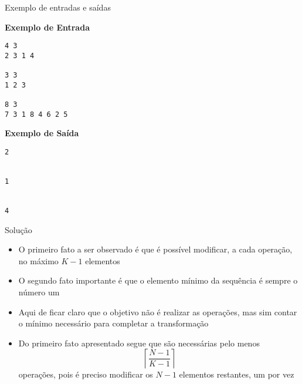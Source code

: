 \begin{frame}[fragile]{Exemplo de entradas e saídas}

\begin{minipage}[t]{0.5\textwidth}
\textbf{Exemplo de Entrada}
\begin{verbatim}
4 3
2 3 1 4

3 3
1 2 3

8 3
7 3 1 8 4 6 2 5
\end{verbatim}
\end{minipage}
\begin{minipage}[t]{0.45\textwidth}
\textbf{Exemplo de Saída}
\begin{verbatim}
2


1


4
\end{verbatim}
\end{minipage}
\end{frame}

\begin{frame}[fragile]{Solução}

    \begin{itemize}
        \item O primeiro fato a ser observado é que é possível modificar, a cada operação, no
            máximo $K - 1$ elementos

        \item O segundo fato importante é que o elemento mínimo da sequência é sempre o número
            um

        \item Aqui de ficar claro que o objetivo não é realizar as operações, mas sim contar o
            mínimo necessário para completar a transformação

        \item Do primeiro fato apresentado segue que são necessárias pelo menos 
        \[
            \left\lceil \frac{N - 1}{K - 1} \right\rceil
        \] operações,  pois é preciso modificar os $N - 1$ elementos restantes, um por vez
    \end{itemize}

\end{frame}


